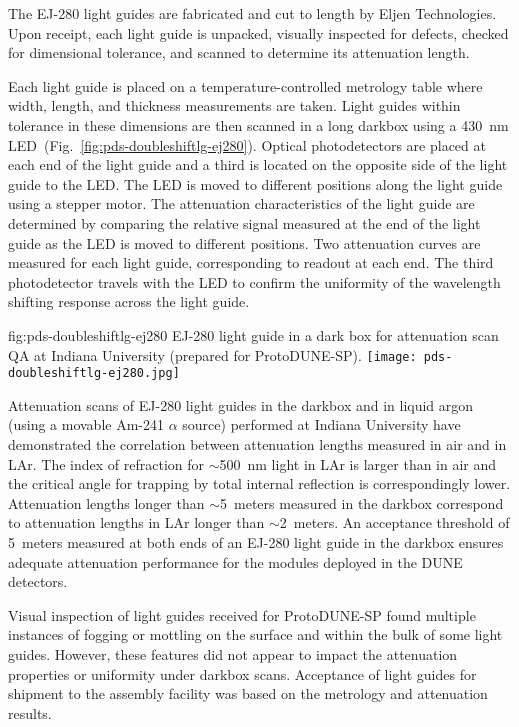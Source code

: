 The EJ-280 light guides are fabricated and cut to length by Eljen Technologies. Upon receipt, each light guide is unpacked, visually inspected for defects, checked for dimensional tolerance, and scanned to determine its attenuation length.

Each light guide is placed on a temperature-controlled metrology table where width, length, and thickness measurements are taken. Light guides within tolerance in these dimensions are then scanned in a long darkbox using a 430~nm LED~(Fig.~\ref{fig:pds-doubleshiftlg-ej280}). Optical photodetectors are placed at each end of the light guide and a third is located on the opposite side of the light guide to the LED. The LED is moved to different positions along the light guide using a stepper motor. The attenuation characteristics of the light guide are determined by comparing the relative signal measured at the end of the light guide as the LED is moved to different positions. Two attenuation curves are measured for each light guide, corresponding to readout at each end. The third photodetector travels with the LED to confirm the uniformity of the wavelength shifting response across the light guide.

\begin{dunefigure}{fig:pds-doubleshiftlg-ej280}
{EJ-280 light guide in a dark box for attenuation scan QA at Indiana University (prepared for ProtoDUNE-SP).}
  \texttt{[image: pds-doubleshiftlg-ej280.jpg]}
\end{dunefigure}

Attenuation scans of EJ-280 light guides in the darkbox and in liquid argon (using a movable Am-241 $\alpha$ source) performed at Indiana University have demonstrated the correlation between attenuation lengths measured in air and in LAr. The index of refraction for $\sim$500~nm light in LAr is larger than in air and the critical angle for trapping by total internal reflection is correspondingly lower. Attenuation lengths longer than $\sim$5~meters measured in the darkbox correspond to attenuation lengths in LAr longer than $\sim$2~meters. An acceptance threshold of 5~meters measured at both ends of an EJ-280 light guide in the darkbox ensures adequate attenuation performance for the modules deployed in the DUNE detectors.

Visual inspection of light guides received for ProtoDUNE-SP found multiple instances of fogging or mottling on the surface and within the bulk of some light guides. However, these features did not appear to impact the attenuation properties or uniformity under darkbox scans. Acceptance of light guides for shipment to the assembly facility was based on the metrology and attenuation results.

